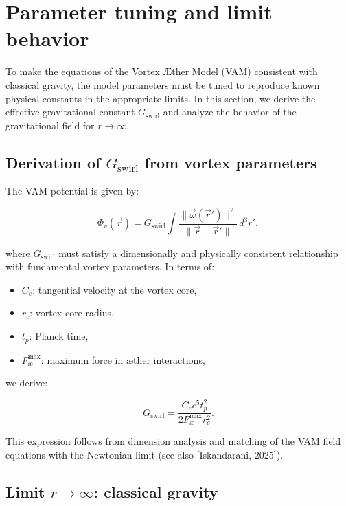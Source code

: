 \section{Parameter tuning and limit behavior}\label{sec:appendix:6}

To make the equations of the Vortex Æther Model (VAM) consistent with classical gravity, the model parameters must be tuned to reproduce known physical constants in the appropriate limits. In this section, we derive the effective gravitational constant $G_\text{swirl}$ and analyze the behavior of the gravitational field for $r \to \infty$.

\subsection{Derivation of $G_\text{swirl}$ from vortex parameters}

The VAM potential is given by:

\begin{equation}
  \Phi_v(\vec{r}) = G_\text{swirl} \int \frac{\|\vec{\omega}(\vec{r}')\|^2}{\|\vec{r} - \vec{r}'\|} \, d^3r',
\end{equation}

where $G_\text{swirl}$ must satisfy a dimensionally and physically consistent relationship with fundamental vortex parameters. In terms of:

\begin{itemize}
  \item $C_e$: tangential velocity at the vortex core,
  \item $r_c$: vortex core radius,
  \item $t_p$: Planck time,
  \item $F^{\text{max}}_{\text{\ae}}$: maximum force in æther interactions,
\end{itemize}

we derive:

\begin{equation}
  G_\text{swirl} = \frac{C_e c^5 t_p^2}{2 F^{\text{max}}_{\text{\ae}} r_c^2}.
\end{equation}

This expression follows from dimension analysis and matching of the VAM field equations with the Newtonian limit (see also [Iskandarani, 2025]).

\subsection{Limit $r \to \infty$: classical gravity}

